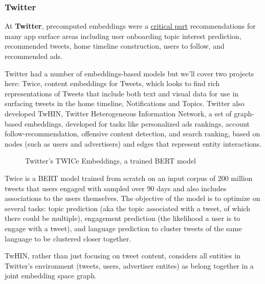 \documentclass[11pt, table]{diazessay} %
\begin{document}
\begin{sloppypar}
\subsubsection{Twitter}
At \textbf{Twitter},  precomputed embeddings were a \href{https://blog.twitter.com/engineering/en_us/topics/insights/2018/embeddingsattwitter}{critical part} recommendations for many app surface areas including user onboarding topic interest prediction, recommended tweets, home timeline construction, users to follow, and recommended ads. 

Twitter had a number of embeddings-based models but we'll cover two projects here: Twice\citep{liu2022twice}, content embeddings for Tweets, which looks to find rich representations of Tweets that include both text and visual data for use in surfacing tweets in the home timeline, Notifications and Topics. Twitter also developed TwHIN\citep{el2022twhin}, Twitter Heterogeneous Information Network, a set of graph-based embeddings\citep{el2022twhin}, developed for tasks like personalized ads rankings, account follow-recommendation, offensive content detection, and search ranking, based on nodes (such as users and advertisers) and edges that represent entity interactions.

\begin{figure}[H]
\caption{Twitter's TWICe Embeddings, a trained BERT model\citep{liu2022twice}}
\end{figure}


Twice is a BERT model trained from scratch on an input corpus of 200 million tweets that users engaged with sampled over 90 days and also includes associations to the users themselves. The objective of the model is to optimize on several tasks: topic prediction (aka the topic associated with a tweet, of which there could be multiple), engagement prediction (the likelihood a user is to engage with a tweet), and language prediction to cluster tweets of the same language to be clustered closer together. 


TwHIN, rather than just focusing on tweet content, considers all entities in Twitter's environment (tweets, users, advertiser entites) as belong together in a joint embedding space graph. 


\end{sloppypar}
\end{document}
